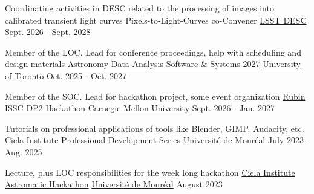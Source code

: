 

\begin{cventries}

  \cventry
    {Coordinating activities in DESC related to the processing of images into calibrated transient light curves} %
    {Pixels-to-Light-Curves co-Convener} %
    {\href{https://lsstdesc.org/}{LSST DESC}} %
    {Sept. 2026 - Sept. 2028} %

  \cventry
    {Member of the LOC. Lead for conference proceedings, help with scheduling and design materials} %
    {\href{https://adass2027.org/}{Astronomy Data Analysis Software \& Systems 2027}} %
    {\href{https://astrostatuoft.com/}{University of Toronto}} %
    {Oct. 2025 - Oct. 2027} %

  \cventry
    {Member of the SOC. Lead for hackathon project, some event organization} %
    {\href{https://issc.science.lsst.org/}{Rubin ISSC DP2 Hackathon}} %
    {\href{https://www.cmu.edu/}{Carnegie Mellon University }} %
    {Sept. 2026 - Jan. 2027} %

  \cventry
    {Tutorials on professional applications of tools like Blender, GIMP, Audacity, etc.} %
    {\href{https://ciela.science/}{Ciela Institute Professional Development Series}} %
    {\href{https://www.umontreal.ca/en/astrophysics/}{Universit{\'e} de Monr{\'e}al}} %
    {July 2023 - Aug. 2025} %

  \cventry
    {Lecture, plus LOC responsibilities for the week long hackathon} %
    {\href{https://ciela.science/}{Ciela Institute Astromatic Hackathon}} %
    {\href{https://www.umontreal.ca/en/astrophysics/}{Universit{\'e} de Monr{\'e}al}} %
    {August 2023} %
    

\end{cventries}

